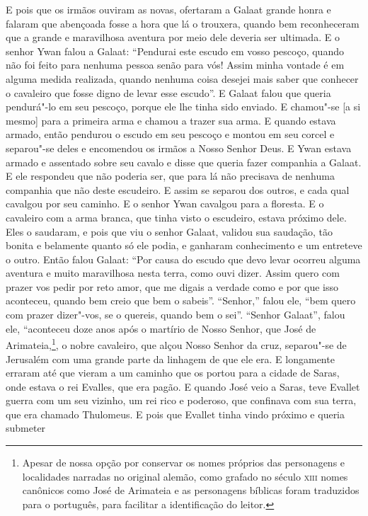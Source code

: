 E pois que os irmãos ouviram as novas, ofertaram a Galaat grande honra e falaram
que abençoada fosse a hora que lá o trouxera, quando bem reconheceram que a
grande e maravilhosa aventura por meio dele deveria ser ultimada. E o
senhor Ywan falou a Galaat: “Pendurai este escudo em vosso pescoço, quando não
foi feito para nenhuma pessoa senão para vós! Assim minha vontade é em alguma
medida realizada, quando nenhuma coisa desejei mais saber que conhecer o
cavaleiro que fosse digno de levar esse escudo”. E Galaat falou que queria
pendurá"-lo em seu pescoço, porque ele lhe tinha sido enviado. E chamou"-se [a si mesmo] para
a primeira arma e chamou a trazer sua arma. E quando estava armado, então
pendurou o escudo em seu pescoço e montou em seu corcel e separou"-se deles e
encomendou os irmãos a Nosso Senhor Deus. E Ywan estava armado e assentado
sobre seu cavalo e disse que queria fazer companhia a Galaat. E ele respondeu
que não poderia ser, que para lá não precisava de nenhuma companhia que não
deste escudeiro. E assim se separou dos outros, e cada qual cavalgou por seu
caminho. E o senhor Ywan cavalgou para a floresta. E o cavaleiro com a arma
branca, que tinha visto o escudeiro, estava próximo dele. Eles o saudaram, e
pois que viu o senhor Galaat, validou sua saudação, tão bonita e belamente
quanto só ele podia, e ganharam conhecimento e um entreteve o outro. Então
falou Galaat: “Por causa do escudo que devo levar ocorreu alguma aventura e
muito maravilhosa nesta terra, como ouvi dizer. Assim quero com prazer vos
pedir por reto amor, que me digais a verdade como e por que isso aconteceu,
quando bem creio que bem o sabeis”. “Senhor,” falou ele, “bem quero com prazer
dizer"-vos, se o quereis, quando bem o sei”. “Senhor Galaat”, falou ele,
“aconteceu doze anos após o martírio de Nosso Senhor, que José de
Arimateia,\footnote{ Apesar de nossa opção por conservar os nomes próprios das
personagens e localidades narradas no original alemão, como grafado no século
\textsc{xiii} nomes canônicos como José de Arimateia e as personagens bíblicas foram
traduzidos para o português, para facilitar a identificação do leitor.}, 
o nobre cavaleiro, que alçou Nosso Senhor da cruz, separou"-se de
Jerusalém com uma grande parte da linhagem de que ele era. E longamente erraram
até que vieram a um caminho que os portou para a cidade de Saras, onde estava o
rei Evalles, que era pagão. E quando José veio a Saras, teve Evallet guerra com
um seu vizinho, um rei rico e poderoso, que confinava com sua terra, que era
chamado Thulomeus. E pois que Evallet tinha vindo próximo e queria submeter
